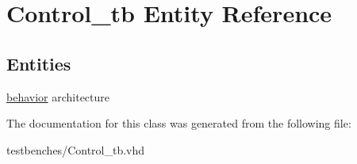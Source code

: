 \hypertarget{class_control__tb}{\section{\-Control\-\_\-tb \-Entity \-Reference}
\label{class_control__tb}
}
\subsection*{\-Entities}
\begin{DoxyCompactItemize}
\item 
\hyperlink{class_control__tb_1_1behavior}{behavior} architecture
\end{DoxyCompactItemize}


\-The documentation for this class was generated from the following file\-:\begin{DoxyCompactItemize}
\item 
testbenches/\-Control\-\_\-tb.\-vhd\end{DoxyCompactItemize}
